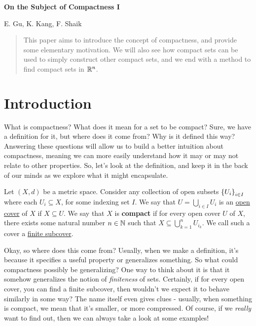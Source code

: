 \documentclass{article}
\begin{document}
\begin{center}
    {\Large \textbf{On the Subject of Compactness I}}

    \medskip
    {\large E. Gu, K. Kang, F. Shaik}
\end{center}

\begin{abstract}
    This paper aims to introduce the concept of compactness, and provide some elementary motivation.
    We will also see how compact sets can be used to simply construct other compact sets, and
    we end with a method to find compact sets in $ \mathbb{R}^{n} $.
\end{abstract}

\section{Introduction}
\setcounter{subsection}{1}

What is compactness? What does it mean for a set to be compact?
Sure, we have a definition for it, but where does it come from? Why is it defined this way?
Answering these questions will allow us to build a better intuition about compactness,
meaning we can more easily understand how it may or may not relate to other properties.
So, let's look at the definition, and keep it in the back of our minds as we explore what it
might encapsulate.

\begin{defn}
    Let $ (X, d) $ be a metric space. \vsp
    Consider any collection of open subsets $ \left\{{U_{i}}\right\}_{i \in I} $ where each
    $ U_{i} \subseteq X $, for some indexing set $ I $.
    We say that $ U = \bigcup_{i \in I} U_{i} $ is an \underline{open cover} of $ X $ if
    $ X \subseteq U $. \vsp
    We say that $ X $ is \textbf{compact} if for every open cover $ U $ of $ X $, there exists some
    natural number $ n \in \mathbb{N} $ such that $ X \subseteq \bigcup_{k=1}^{n} U_{i_{k}} $.
    We call such a cover a \underline{finite subcover}.
\end{defn}

Okay, so where does this come from?
Usually, when we make a definition, it's because it specifies a useful property or generalizes
something. So what could compactness possibly be generalizing? \vsp
%
One way to think about it is that it somehow generalizes the notion of \textit{finiteness} of sets.
Certainly, if for every open cover, you can find a finite subcover, then wouldn't we expect it
to behave similarly in some way?
The name itself even gives clues - usually, when something is compact, we mean that it's smaller,
or more compressed. Of course, if we \textit{really} want to find out, then we can always take a
look at some examples!
\end{document}
